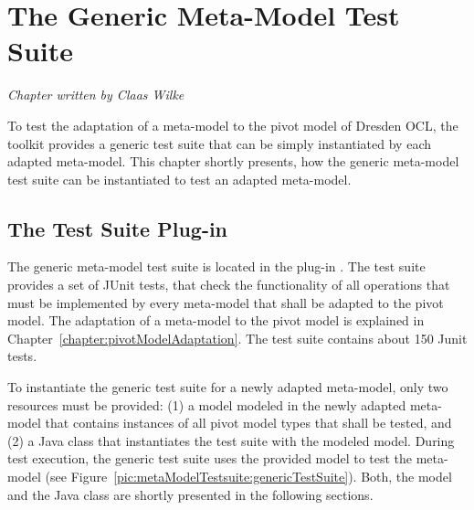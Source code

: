 \chapter{The Generic Meta-Model Test Suite}
\label{chapter:metaModelTestSuite}

\begin{flushright}
\textit{Chapter written by Claas Wilke}
\end{flushright}

To test the adaptation of a meta-model to the pivot model of Dresden OCL, the
toolkit provides a generic test suite that can be simply instantiated by each 
adapted meta-model. This chapter shortly presents, how the generic meta-model 
test suite can be instantiated to test an adapted meta-model.



\section{The Test Suite Plug-in}

The generic meta-model test suite is located in the plug-in 
. The test suite 
provides a set of JUnit tests, that check the functionality of all operations 
that must be implemented by every meta-model that shall be adapted to the pivot 
model. The adaptation of a meta-model to the pivot model is explained in 
Chapter~\ref{chapter:pivotModelAdaptation}. The test suite contains about 150
Junit tests.

To instantiate the generic test suite for a newly adapted meta-model, only two
resources must be provided: (1) a model modeled in the newly adapted meta-model 
that contains instances of all pivot model types that shall be tested, and (2) a
Java class that instantiates the test suite with the modeled model. During test 
execution, the generic test suite uses the provided model to test the meta-model
(see Figure~\ref{pic:metaModelTestsuite:genericTestSuite}). Both, the model and 
the Java class are shortly presented in the following sections.

